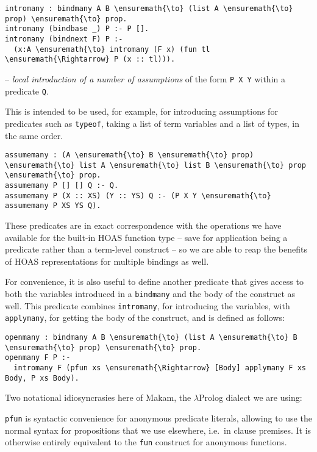 \begin{verbatim}
intromany : bindmany A B \ensuremath{\to} (list A \ensuremath{\to} prop) \ensuremath{\to} prop.
intromany (bindbase _) P :- P [].
intromany (bindnext F) P :-
  (x:A \ensuremath{\to} intromany (F x) (fun tl \ensuremath{\Rightarrow} P (x :: tl))).
\end{verbatim}

-- \emph{local introduction of a number of assumptions} of the form
\texttt{P\ X\ Y} within a predicate \texttt{Q}.

This is intended to be used, for example, for introducing assumptions
for predicates such as \texttt{typeof}, taking a list of term variables
and a list of types, in the same order.

\begin{verbatim}
assumemany : (A \ensuremath{\to} B \ensuremath{\to} prop) \ensuremath{\to} list A \ensuremath{\to} list B \ensuremath{\to} prop \ensuremath{\to} prop.
assumemany P [] [] Q :- Q.
assumemany P (X :: XS) (Y :: YS) Q :- (P X Y \ensuremath{\to} assumemany P XS YS Q).
\end{verbatim}

These predicates are in exact correspondence with the operations we have
available for the built-in HOAS function type -- save for application
being a predicate rather than a term-level construct -- so we are able
to reap the benefits of HOAS representations for multiple bindings as
well.

For convenience, it is also useful to define another predicate that
gives access to both the variables introduced in a \texttt{bindmany} and
the body of the construct as well. This predicate combines
\texttt{intromany}, for introducing the variables, with
\texttt{applymany}, for getting the body of the construct, and is
defined as follows:

\begin{verbatim}
openmany : bindmany A B \ensuremath{\to} (list A \ensuremath{\to} B \ensuremath{\to} prop) \ensuremath{\to} prop.
openmany F P :-
  intromany F (pfun xs \ensuremath{\Rightarrow} [Body] applymany F xs Body, P xs Body).
\end{verbatim}

Two notational idiosyncrasies here of Makam, the \ensuremath{\lambda}Prolog dialect we are
using:

\texttt{pfun} is syntactic convenience for anonymous predicate literals,
allowing to use the normal syntax for propositions that we use
elsewhere, i.e.~in clause premises. It is otherwise entirely equivalent
to the \texttt{fun} construct for anonymous functions.

